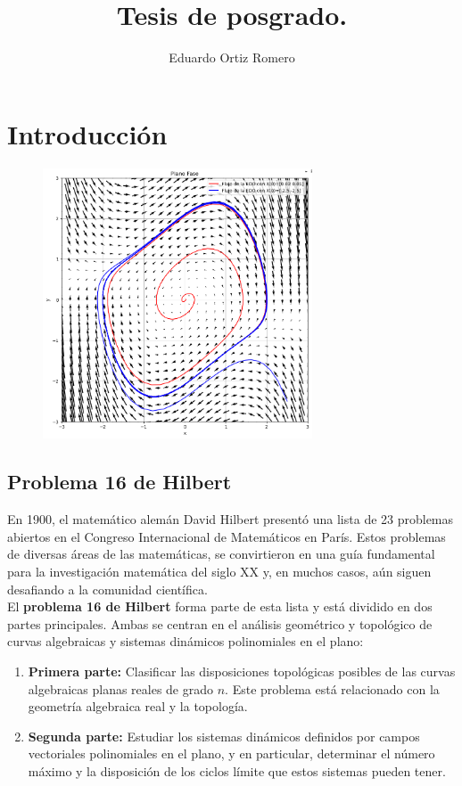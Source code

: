 \documentclass[12pt, a4paper]{report}
\title{Tesis de posgrado.}
\author{Eduardo Ortiz Romero}
\begin{document}
\maketitle
\tableofcontents

\chapter{Introducción}

\begin{figure}[h]
	\centering
	\includegraphics[width=8cm]{portada.png}
\end{figure}

\section{Problema 16 de Hilbert}
En 1900, el matemático alemán David Hilbert presentó una lista de 23 problemas abiertos en el Congreso Internacional de Matemáticos en París. Estos problemas de diversas áreas de las matemáticas, se convirtieron en una guía fundamental para la investigación matemática del siglo XX y, en muchos casos, aún siguen desafiando a la comunidad científica.\\

El \textbf{problema 16 de Hilbert}  forma parte de esta lista y está dividido en dos partes principales. Ambas se centran en el análisis geométrico y topológico de curvas algebraicas y sistemas dinámicos polinomiales en el plano:

\begin{enumerate}
	\item \textbf{Primera parte:} Clasificar las disposiciones topológicas posibles de las curvas algebraicas planas reales de grado $n$. Este problema está relacionado con la geometría algebraica real y la topología.
	\item \textbf{Segunda parte:} Estudiar los sistemas dinámicos definidos por campos vectoriales polinomiales en el plano, y en particular, determinar el número máximo y la disposición de los ciclos límite que estos sistemas pueden tener.
\end{enumerate}
\end{document}
